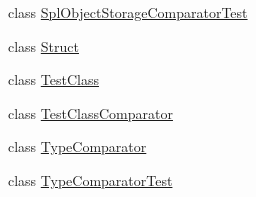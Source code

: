 \begin{DoxyCompactItemize}
\item 
class \mbox{\hyperlink{class_sebastian_bergmann_1_1_comparator_1_1_spl_object_storage_comparator_test}{Spl\+Object\+Storage\+Comparator\+Test}}
\item 
class \mbox{\hyperlink{class_sebastian_bergmann_1_1_comparator_1_1_struct}{Struct}}
\item 
class \mbox{\hyperlink{class_sebastian_bergmann_1_1_comparator_1_1_test_class}{Test\+Class}}
\item 
class \mbox{\hyperlink{class_sebastian_bergmann_1_1_comparator_1_1_test_class_comparator}{Test\+Class\+Comparator}}
\item 
class \mbox{\hyperlink{class_sebastian_bergmann_1_1_comparator_1_1_type_comparator}{Type\+Comparator}}
\item 
class \mbox{\hyperlink{class_sebastian_bergmann_1_1_comparator_1_1_type_comparator_test}{Type\+Comparator\+Test}}
\end{DoxyCompactItemize}
